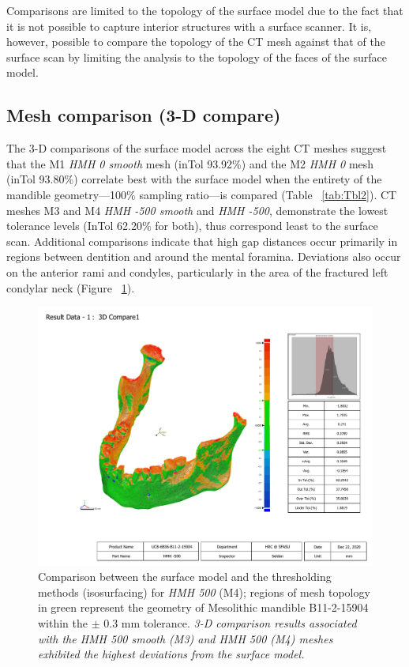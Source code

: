 \documentclass[review]{elsarticle}
\begin{document}
Comparisons are limited to the topology of the surface model due to the fact that it is not possible to capture interior structures with a surface scanner. It is, however, possible to compare the topology of the CT mesh against that of the surface scan by limiting the analysis to the topology of the faces of the surface model. 

\subsection{Mesh comparison (3-D compare)}

The 3-D comparisons of the surface model across the eight CT meshes suggest that the M1 \textit{HMH 0 smooth} mesh (inTol 93.92\%) and the M2 \textit{HMH 0} mesh (inTol 93.80\%) correlate best with the surface model when the entirety of the mandible geometry---100\% sampling ratio---is compared (Table ~\ref{tab:Tbl2}). CT meshes M3 and M4 \textit{HMH -500 smooth} and \textit{HMH -500}, demonstrate the lowest tolerance levels (InTol 62.20\% for both), thus correspond least to the surface scan. Additional comparisons indicate that high gap distances occur primarily in regions between dentition and around the mental foramina. Deviations also occur on the anterior rami and condyles, particularly in the area of the fractured left condylar neck (Figure ~\ref{fig:Fig3}). 

\begin{figure}[ht]\centering
\includegraphics[width=\linewidth]{fig3.pdf}
\caption{Comparison between the surface model and the thresholding methods (isosurfacing) for \textit{HMH 500} (M4); regions of mesh topology in green represent the geometry of Mesolithic mandible B11-2-15904 within the $\pm$ 0.3 mm tolerance. \textit{3-D comparison results associated with the HMH 500 smooth (M3) and HMH 500 (M4) meshes exhibited the highest deviations from the surface model.}}
\label{fig:Fig3}
\end{figure}
\end{document}
